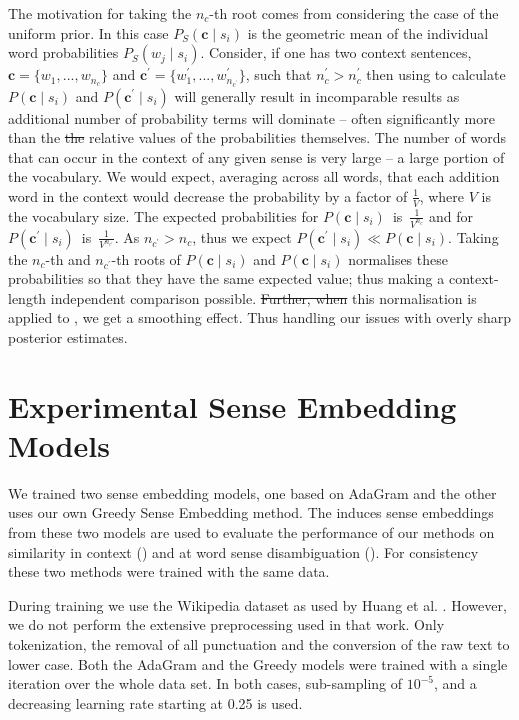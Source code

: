 \documentclass{article} %
\def\parencite{\cite} %
\renewcommand{\c}{\mathbf{c}}
\providecommand{\DIFadd}[1]{{\protect\color{blue}\uwave{#1}}} %
\providecommand{\DIFdel}[1]{{\protect\color{red}\sout{#1}}}                      %
\providecommand{\DIFaddbegin}{} %
\providecommand{\DIFaddend}{} %
\providecommand{\DIFdelbegin}{} %
\providecommand{\DIFdelend}{} %
\begin{document}
\DIFaddend The motivation for taking the $n_c$-th root comes from considering the case of the uniform prior.
In this case $P_S(\c \mid s_{i})$ is the geometric mean of the individual word probabilities $P_S(w_j \mid s_{i})$.
Consider, if one has two context sentences, $\c=\{w_1,...,w_{n_c}\}$ and $\c^\prime=\{w_1^\prime,...,w^\prime_{n_{c^\prime}}\}$, such that $n_c^\prime > n_c^\prime$
then using  to calculate $P(\c \mid s_{i})$ and $P(\c^\prime \mid s_{i})$ will generally result in incomparable results as additional number of probability terms will dominate -- often significantly more than the \DIFdelbegin \DIFdel{the }\DIFdelend relative values of the probabilities themselves.
The number of words that can occur in the context of any given sense is very large -- a large portion of the vocabulary. We would expect, averaging across all words, that each addition word in the context would decrease the probability by a factor of $\frac{1}{V}$, where  $V$ is the vocabulary size. 
The expected probabilities for \mbox{$P(\c \mid s_{i})$ is $\frac{1}{V^{n_c}}$} and for \mbox{$P(\c^\prime \mid s_{i})$ is $\frac{1}{V^{n_{c^\prime}}}$}. As $n_{c^\prime} > n_c$, thus we expect $P(\c^\prime \mid s_{i}) \ll P(\c \mid s_{i})$.
Taking the $n_{c}$-th and $n_{c^\prime}$-th roots of $P(\c \mid s_{i})$ and $P(\c \mid s_{i})$ normalises these probabilities so that they have the same expected value; thus making a context-length independent comparison possible.
\DIFdelbegin \DIFdel{Further, when }\DIFdelend \DIFaddbegin \DIFadd{When }\DIFaddend this normalisation is applied to , we get a smoothing effect. Thus handling our issues with overly sharp posterior estimates.

\section{Experimental Sense Embedding Models} 
\DIFaddbegin \label{Models}
\DIFaddend We trained two sense embedding models, one based on AdaGram \parencite{AdaGrams} 
and the other uses our own Greedy Sense Embedding method. 
The induces sense embeddings from these two models are used to evaluate the performance of our methods on similarity in context () and at word sense disambiguation (). For consistency these two methods were trained with the same data.

During training we use the Wikipedia dataset as used by Huang et al. \parencite{Huang2012}.
However, we do not perform the extensive preprocessing used in that work.
Only tokenization, the removal of all punctuation and the conversion of the raw text to lower case.
Both the AdaGram and the Greedy models were trained with a single iteration over the whole data set.
In both cases, sub-sampling of $10^{-5}$, and a decreasing learning rate starting at 0.25 is used.
\end{document}
